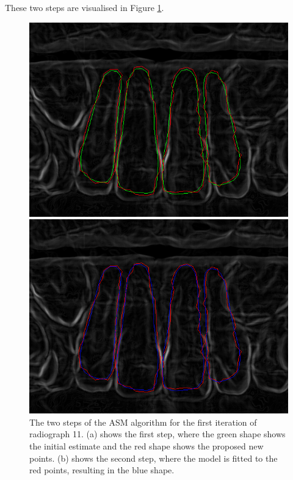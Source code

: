 \documentclass[a4paper,titlepage,12pt]{article}
\begin{document}
These two steps are visualised in Figure \ref{asm}.

\begin{figure}
  \centering
	\begin{minipage}[b]{0.48\linewidth}
		\includegraphics[width=\linewidth]{asm/step1.png}
	\end{minipage}
	\begin{minipage}[b]{0.48\linewidth}
		\includegraphics[width=\linewidth]{asm/step2.png}
	\end{minipage}
  \caption{
		The two steps of the ASM algorithm for the first iteration of radiograph 11.
		(a) shows the first step, where the green shape shows the initial estimate and the red shape shows the proposed new points.
		(b) shows the second step, where the model is fitted to the red points, resulting in the blue shape.} \label{asm}
\end{figure}
\end{document}
